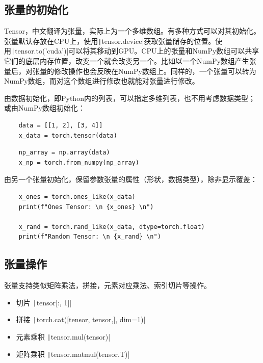 \documentclass[fontset=ubuntu]{ctexart}
\begin{document}
\subsection{张量的初始化}
Tensor，中文翻译为张量，实际上为一个多维数组。有多种方式可以对其初始化。张量默认存放在CPU上，使用\texttt|tensor.device|获取张量储存的位置。使用\texttt|tensor.to('cuda')|可以将其移动到GPU。CPU上的张量和NumPy数组可以共享它们的底层内存位置，改变一个就会改变另一个。比如以一个NumPy数组产生张量后，对张量的修改操作也会反映在NumPy数组上。同样的，一个张量可以转为NumPy数组，而对这个数组进行修改也就能对张量进行修改。

由数据初始化，即Python内的列表，可以指定多维列表，也不用考虑数据类型；或由NumPy数组初始化：
\begin{listing}[htb]
    \begin{verbatim}
    data = [[1, 2], [3, 4]]
    x_data = torch.tensor(data)
    \end{verbatim}    
\end{listing}

\begin{listing}[htb]
    \begin{verbatim}
    np_array = np.array(data)
    x_np = torch.from_numpy(np_array)
    \end{verbatim}    
\end{listing}

由另一个张量初始化，保留参数张量的属性（形状，数据类型），除非显示覆盖：
\begin{listing}[htb]
 \begin{verbatim}
    x_ones = torch.ones_like(x_data)
    print(f"Ones Tensor: \n {x_ones} \n")

    x_rand = torch.rand_like(x_data, dtype=torch.float)
    print(f"Random Tensor: \n {x_rand} \n")
 \end{verbatim}    
\end{listing}

\subsection{张量操作}
张量支持类似矩阵乘法，拼接，元素对应乘法、索引切片等操作。
\begin{itemize}
    \item 切片 \texttt|tensor[:, 1]|
    \item 拼接 \texttt|torch.cat([tensor, tensor,], dim=1)|
    \item 元素乘积 \texttt|tensor.mul(tensor)|
    \item 矩阵乘积 \texttt|tensor.matmul(tensor.T)|
\end{itemize}
\end{document}
